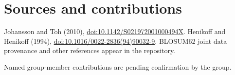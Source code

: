 \documentclass[10pt,a4paper]{article}
\begin{document}
\section{Sources and contributions}
Johansson and Toh (2010), \href{https://doi.org/10.1142/S021972001000494X}{doi:10.1142/S021972001000494X}. Henikoff and Henikoff (1994), \href{https://doi.org/10.1016/0022-2836(94)90032-9}{doi:10.1016/0022-2836(94)90032-9}. BLOSUM62 joint data provenance and other references appear in the repository.

Named group-member contributions are pending confirmation by the group.
\end{document}

